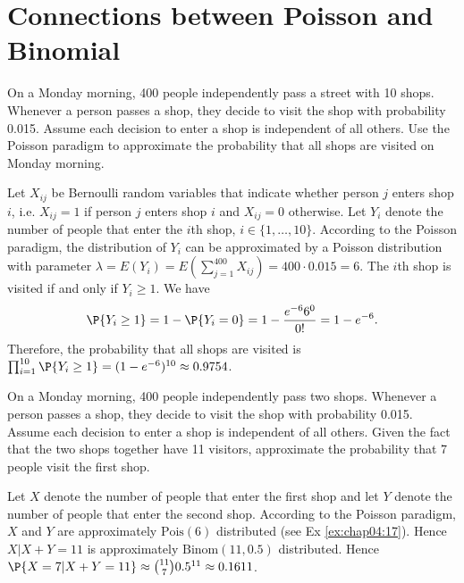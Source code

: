 \section{Connections between Poisson and Binomial}
\label{sec:section-4.6}

\begin{exercise}\label{ex:chap04:17}
	On a Monday morning, 400 people independently pass a street with 10 shops. Whenever a person passes a shop, they decide to visit the shop with probability 0.015. Assume each decision to enter a shop is independent of all others. Use the Poisson paradigm to approximate the probability that all shops are visited on Monday morning.
	\begin{solution}
		Let $X_{ij}$ be Bernoulli random variables that indicate whether person $j$ enters shop $i$, i.e. $X_{ij} = 1$ if person $j$ enters shop $i$ and $X_{ij} = 0$ otherwise. Let $Y_i$ denote the number of people that enter the $i$th shop, $i \in \{1, \hdots, 10\}$. According to the Poisson paradigm, the distribution of $Y_i$ can be approximated by a Poisson distribution with parameter $\lambda = E(Y_i) = E(\sum_{j = 1}^{400} X_{ij}) = 400 \cdot 0.015 = 6$. The $i$th shop is visited if and only if $Y_i \geq 1$. We have
		\begin{equation*}
			\P{Y_i \geq 1} = 1 - \P{Y_i = 0} = 1 - \frac{e^{-6} 6^0}{0!} = 1 - e^{-6}.
		\end{equation*}
		Therefore, the probability that all shops are visited is $\prod_{i = 1}^{10} \P{Y_i \geq 1} = (1 - e^{-6})^{10} \approx 0.9754$.
	\end{solution}
\end{exercise}

\begin{exercise}
	On a Monday morning, 400 people independently pass two shops. Whenever a person passes a shop, they decide to visit the shop with probability 0.015. Assume each decision to enter a shop is independent of all others. Given the fact that the two shops together have 11 visitors, approximate the probability that 7 people visit the first shop.
	\begin{solution}
		Let $X$ denote the number of people that enter the first shop and let $Y$ denote the number of people that enter the second shop. According to the Poisson paradigm, $X$ and $Y$ are approximately $\text{Pois}(6)$ distributed (see Ex \ref{ex:chap04:17}). Hence $X | X + Y = 11$ is approximately $\text{Binom}(11, 0.5)$ distributed. Hence $\P{X = 7| X + Y = 11} \approx \binom{11}{7} 0.5^{11} \approx 0.1611$.
	\end{solution}
\end{exercise}

